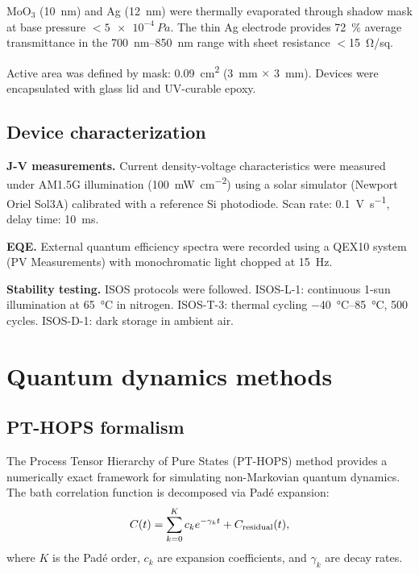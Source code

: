\documentclass[11pt,a4paper]{article}
\begin{document}
MoO$_3$ (\SI{10}{\nano\meter}) and Ag (\SI{12}{\nano\meter}) were thermally evaporated through shadow mask at base pressure $< \SI{5e-4}{Pa}$. The thin Ag electrode provides \SI{72}{\percent} average transmittance in the \SIrange{700}{850}{\nano\meter} range with sheet resistance $<$\SI{15}{\ohm/sq}.

Active area was defined by mask: \SI{0.09}{\centi\meter\squared} (\SI{3}{\milli\meter} $\times$ \SI{3}{\milli\meter}). Devices were encapsulated with glass lid and UV-curable epoxy.

\subsection{Device characterization}

\textbf{J-V measurements.} Current density-voltage characteristics were measured under AM1.5G illumination (\SI{100}{\milli\watt\per\centi\meter\squared}) using a solar simulator (Newport Oriel Sol3A) calibrated with a reference Si photodiode. Scan rate: \SI{0.1}{\volt\per\second}, delay time: \SI{10}{\milli\second}.

\textbf{EQE.} External quantum efficiency spectra were recorded using a QEX10 system (PV Measurements) with monochromatic light chopped at \SI{15}{Hz}.

\textbf{Stability testing.} ISOS protocols were followed. ISOS-L-1: continuous 1-sun illumination at \SI{65}{\degreeCelsius} in nitrogen. ISOS-T-3: thermal cycling \SIrange{-40}{+85}{\degreeCelsius}, 500 cycles. ISOS-D-1: dark storage in ambient air.

\section{Quantum dynamics methods}\label{si:quantum_methods}

\subsection{PT-HOPS formalism}

The Process Tensor Hierarchy of Pure States (PT-HOPS) method provides a numerically exact framework for simulating non-Markovian quantum dynamics. The bath correlation function is decomposed via Pad\'e expansion:
\begin{equation}
C(t) = \sum_{k=0}^{K} c_k e^{-\gamma_k t} + C_{\rm residual}(t),
\end{equation}
where $K$ is the Pad\'e order, $c_k$ are expansion coefficients, and $\gamma_k$ are decay rates.
\end{document}
